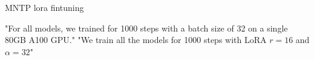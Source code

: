 \documentclass[11pt,a4paper]{article}
\title{}
\author{}
\date{}
\begin{document}
\maketitle



MNTP lora fintuning

"For all models, we trained for 1000 steps with a batch size of 32 on
a single 80GB A100 GPU."
"We train all the models for 1000 steps with LoRA $r=16$ and $\alpha=32$"






\end{document}
